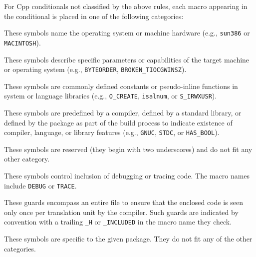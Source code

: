 \documentclass[10pt]{article}
\begin{document}
For Cpp conditionals not classified by the above rules, each macro
appearing in the conditional is placed in one of the following categories:

\begin{description}\itemsep 0pt \parskip 0pt

\item[Portability, machine]
  These symbols name the operating system or machine
  hardware (e.g., \texttt{sun386} or \texttt{MACINTOSH}).
      
\item[Portability, feature] These symbols describe specific parameters
      or capabilities of the target machine or operating system (e.g.,
      \texttt{BYTEORDER}, \verb|BROKEN_TIOCGWINSZ|).  
      

\item[Portability, system]
  These symbols are commonly defined constants or
  pseudo-inline functions in system or language libraries (e.g.,
  \verb|O_CREATE|, \texttt{isalnum}, or \verb|S_IRWXUSR|).

\item[Portability, language or library]
  These symbols are predefined by a compiler, defined by a standard
  library, or defined by the package as part of the build
  process to indicate existence of compiler, language, or library features
  (e.g., \texttt{GNUC}, \texttt{STDC}, or \verb|HAS_BOOL|).

\item[Miscellaneous system]
  These symbols are reserved (they begin with two underscores) and do
  not fit any other category.
      
\item[Debugging]
  These symbols control inclusion of debugging or tracing code.  The macro
  names include \texttt{DEBUG} or \texttt{TRACE}.
      
\item[Multiple inclusion prevention]
  These guards encompass an entire file to ensure that the enclosed code is
  seen only once per translation unit by the compiler.  Such guards are
  indicated by convention with a trailing \verb|_H| or \verb|_INCLUDED| in the macro name
  they check.

\item[Package-specific] 
  These symbols are specific to the given package.  They do not fit any of
  the other categories.

\end{description}
\end{document}
